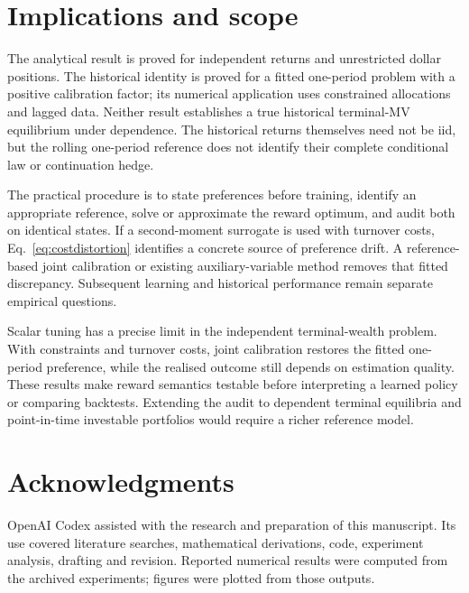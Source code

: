 \documentclass[sigconf,anonymous,review]{acmart}
\begin{document}
\section{Implications and scope}
The analytical result is proved for independent returns and unrestricted dollar positions. The historical identity is proved for a fitted one-period problem with a positive calibration factor; its numerical application uses constrained allocations and lagged data. Neither result establishes a true historical terminal-MV equilibrium under dependence. The historical returns themselves need not be iid, but the rolling one-period reference does not identify their complete conditional law or continuation hedge.

The practical procedure is to state preferences before training, identify an appropriate reference, solve or approximate the reward optimum, and audit both on identical states. If a second-moment surrogate is used with turnover costs, Eq.\ \eqref{eq:costdistortion} identifies a concrete source of preference drift. A reference-based joint calibration or existing auxiliary-variable method removes that fitted discrepancy. Subsequent learning and historical performance remain separate empirical questions.

Scalar tuning has a precise limit in the independent terminal-wealth problem. With constraints and turnover costs, joint calibration restores the fitted one-period preference, while the realised outcome still depends on estimation quality. These results make reward semantics testable before interpreting a learned policy or comparing backtests. Extending the audit to dependent terminal equilibria and point-in-time investable portfolios would require a richer reference model.

\section*{Acknowledgments}
OpenAI Codex assisted with the research and preparation of this manuscript. Its use covered literature searches, mathematical derivations, code, experiment analysis, drafting and revision. Reported numerical results were computed from the archived experiments; figures were plotted from those outputs.

\clearpage


\end{document}
